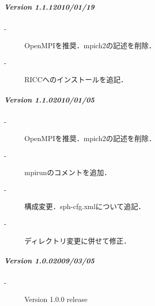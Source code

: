 %
\subparagraph{Version 1.1.1\hspace{1cm}2010/01/19}
\label{v111}

\begin{description}
\item[-] OpenMPIを推奨．mpich2の記述を削除．
\item[-] RICCへのインストールを追記．
\end{description}
\vspace{2mm}

%
\subparagraph{Version 1.1.0\hspace{1cm}2010/01/05}
\label{v110}

\begin{description}
\item[-] OpenMPIを推奨．mpich2の記述を削除．
\item[-] mpirunのコメントを追加．
\item[-] 構成変更．sph-cfg.xmlについて追記．
\item[-] ディレクトリ変更に併せて修正．
\end{description}
\vspace{2mm}

%
\subparagraph{Version 1.0.0\hspace{1cm}2009/03/05}
\label{v100}

\begin{description}
\item[-] Version 1.0.0 release
\end{description}
\vspace{2mm}
